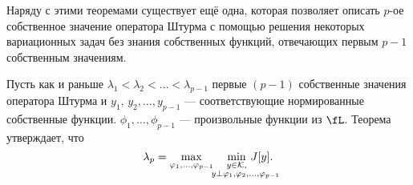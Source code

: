 Наряду с этими теоремами существует ещё одна, которая позволяет описать $p$-ое собственное значение оператора Штурма с помощью решения некоторых вариационных задач без знания собственных функций, отвечающих первым $p-1$ собственным значениям.
\begin{_teor}
	\label{l5:s2:teor:4}
	Пусть как и раньше $\lambda_1<\lambda_2<\ldots<\lambda_{p-1}$ первые $(p-1)$ собственные значения оператора Штурма и $y_1,\,y_2,\ldots,y_{p-1}$ --- соответствующие нормированные собственные функции. $\phi_1,\ldots,\phi_{p-1}$ --- произвольные функции из $\fL$. Теорема утверждает, что
	\begin{equation}
		\label{l5:eq:12}
		\hfill\lambda_p=\max\limits_{\phi_1,\ldots,\phi_{p-1}}\quad\min\limits_{\substack{y\in\K,\\\lefteqn{\scriptstyle \hspace*{-0.8cm}y\perp\phi_1,\phi_2,\ldots,\phi_{p-1}}}}\,J[y].\hfill
	\end{equation}
\end{_teor}
